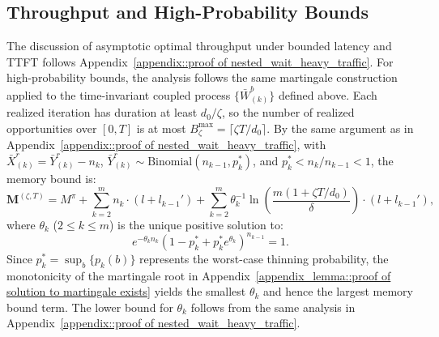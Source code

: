 \subsection{Throughput and High-Probability Bounds}

The discussion of asymptotic optimal throughput under bounded latency and TTFT follows Appendix~\ref{appendix::proof of nested_wait_heavy_traffic}. For high-probability bounds, the analysis follows the same martingale construction applied to the time-invariant coupled process $\{ \bar{W}_{(k)}^b \}$ defined above. Each realized iteration has duration at least \(d_0/\zeta\), so the number of realized opportunities over \([0,T]\) is at most \(B_\zeta^{\max}=\lceil \zeta T/d_0\rceil\). By the same argument as in Appendix~\ref{appendix::proof of nested_wait_heavy_traffic}, with $\bar{X}_{(k)}^{r} = \bar{Y}_{(k)}^r - n_k$, $\bar{Y}_{(k)}^r \sim \text{Binomial}(n_{k-1}, p_k^*)$, and $p_k^*<n_k/n_{k-1}<1$, the memory bound is:
$$\mathbf{M}^{(\zeta,T)} = M^{\pi} + \sum_{k=2}^m n_k \cdot (l + l_{k-1}') + \sum_{k=2}^m \theta_k^{-1}\ln\left( \frac{m(1+\zeta T/d_0)}{\delta} \right) \cdot (l + l_{k-1}'),$$
where $\theta_k$ ($2\leq k\leq m$) is the unique positive solution to:
\begin{equation}
e^{-\theta_k n_k} (1 - p_k^* + p_k^* e^{\theta_k})^{n_{k-1}} = 1.\label{eq::eq of theta, time varying}
\end{equation}
Since $p_k^* = \sup_b \{p_k(b)\}$ represents the worst-case thinning probability, the monotonicity of the martingale root in Appendix~\ref{appendix_lemma::proof of solution to martingale exists} yields the smallest $\theta_k$ and hence the largest memory bound term. The lower bound for $\theta_k$ follows from the same analysis in Appendix~\ref{appendix::proof of nested_wait_heavy_traffic}.
